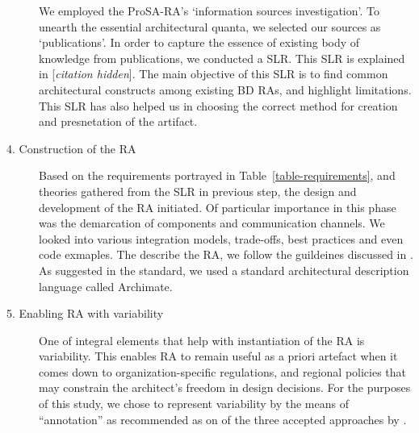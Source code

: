 \documentclass[a4paper,11pt]{article}
\let\cite\citep
\newcommand{\hc}{[\textit{citation hidden}]\textnormal{}}
\begin{document}
\begin{description}
We employed the ProSA-RA's `information sources investigation'. To unearth the essential architectural quanta, we selected our sources as `publications'. In order to capture the essence of existing body of knowledge from publications, we conducted a SLR. This SLR is explained in
\hc{}. The main objective of this SLR is to find common architectural constructs among existing BD RAs, and highlight limitations. This SLR has also helped us in choosing the correct method for creation and presnetation of the artifact.








\item[4. Construction of the RA] Based on the requirements portrayed in Table~\ref{table-requirements}, and theories gathered from the SLR in previous step, the design and development of the RA initiated. Of particular importance in this phase was the demarcation of components and communication channels. We looked into various integration models, trade-offs, best practices and even code exmaples. The describe the RA, we follow the guildeines discussed in \citet{ISO42010}. As suggested in the standard, we used a standard architectural description language called Archimate.


\item[5. Enabling RA with variability] One of integral elements that help with instantiation of the RA is variability. This enables RA to remain useful as a priori artefact when it comes down to organization-specific regulations, and regional policies that may constrain the architect's freedom in design decisions. For the purposes of this study, we chose to represent variability by the means of ``annotation'' as recommended as on of the three accepted approaches by \citet{galster2011empirically}.



\end{description}
\end{document}
